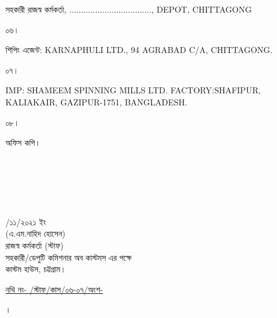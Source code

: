 \documentclass[12pt]{article}
\newcommand{\fileno}{নথি নং- \hspace{5em}/স্টাফ/কাস/০৬-০৭/অংশ-  }
\newcommand{\filenou}{
\begin{minipage}[t]{0.60\linewidth}
\hspace{1em}
\end{minipage}
\begin{minipage}[t]{0.40\linewidth}
\underline{\fileno}
\end{minipage}
}
\newcommand{\nfpage}{
\newpage
\small
{\filenou}
}
\newcommand{\rdepo}{..................................., DEPOT, CHITTAGONG}
\newcommand{\ssml}{SHAMEEM SPINNING MILLS LTD.}
\newcommand{\ssmla}{SHAFIPUR, KALIAKAIR, GAZIPUR-1751, BANGLADESH.}
\newcommand{\impn}{\ssml}
\newcommand{\impadd}{\ssmla}
\newcommand{\karnaphuli}{KARNAPHULI LTD.}
\newcommand{\karnaphulia}{94 AGRABAD C/A, CHITTAGONG.}
\newcommand{\san}{\karnaphuli}
\newcommand{\sad}{\karnaphulia}
\newcommand{\robdt}{\hspace*{3.0em} \hspace{3.5em}/১১/২০২১ ইং}
\begin{document}
\begin{minipage}[t]{0.94\linewidth}
\scriptsize{সহকারী রাজস্ব কর্মকর্তা, {\rdepo}}
\end{minipage}
\begin{minipage}[t]{0.06\linewidth}
\scriptsize{০৬।}
\end{minipage}
\begin{minipage}[t]{0.94\linewidth}
\scriptsize{শিপিং এজেন্ট:
{\san}, {\sad}}
\end{minipage}
\begin{minipage}[t]{0.06\linewidth}
\scriptsize{০৭।}
\end{minipage}
\begin{minipage}[t]{0.94\linewidth}
\scriptsize{IMP: {\impn}
FACTORY:{\impadd}}
\end{minipage}
\begin{minipage}[t]{0.06\linewidth}
\scriptsize{০৮।}
\end{minipage}
\begin{minipage}[t]{0.94\linewidth}
\scriptsize{অফিস কপি।}
\\
\\
\\
\\
\\
\\
\end{minipage}
\begin{minipage}[t]{0.72\linewidth}
\hspace{1em}
\end{minipage}
\begin{minipage}[t]{0.28\linewidth}
\scriptsize{{\robdt}}
\\
\hspace*{4.2em}\footnotesize{(এ.এম.নাহিদ হোসেন)}
\\
\hspace*{3.4em}\footnotesize{রাজস্ব কর্মকর্তা (স্টাফ)}
\\
\scriptsize{সহকারী/ডেপুটি কমিশনার অব কাস্টমস এর পক্ষে}
\\
\hspace*{5.5em}\scriptsize{কাস্টম হাউস, চট্টগ্রাম।}
\end{minipage}
{\nfpage}
\normalsize
\begin{minipage}[t]{0.04\linewidth}
।
\end{minipage}
\end{document}
